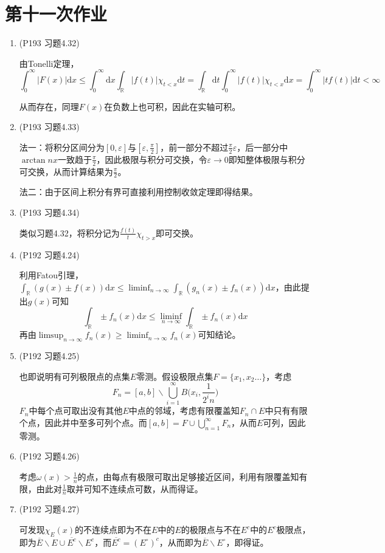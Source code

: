 \documentclass[a4paper,UTF8,fontset=windows]{ctexart}
\begin{document}
\section{第十一次作业}
\begin{enumerate}
    \item (P193 习题4.32)
    
    由Tonelli定理，
    \[\int_0^\infty|F(x)|\mathrm{d}x\le\int_0^\infty\mathrm{d}x\int_\mathbb{R}|f(t)|\chi_{t<x}\mathrm{d}t=\int_\mathbb{R}\mathrm{d}t\int_0^\infty|f(t)|\chi_{t<x}\mathrm{d}x=\int_0^\infty|tf(t)|\mathrm{d}t<\infty\]
    
    从而存在，同理$F(x)$在负数上也可积，因此在实轴可积。
    
    \item (P193 习题4.33)
    
    法一：将积分区间分为$[0,\varepsilon]$与$[\varepsilon,\frac{\pi}{2}]$，前一部分不超过$\frac{\pi}{2}\varepsilon$，后一部分中$\arctan{nx}$一致趋于$\frac{\pi}{2}$，因此极限与积分可交换，令$\varepsilon\to0$即知整体极限与积分可交换，从而计算结果为$\frac{\pi}{2}$。
    
    法二：由于区间上积分有界可直接利用控制收敛定理即得结果。
    
    \item (P193 习题4.34)
    
    类似习题4.32，将积分记为$\frac{f(t)}{t}\chi_{t>x}$即可交换。
    
    \item (P192 习题4.24)
    
    利用Fatou引理，$\int_\mathbb{R}(g(x)\pm f(x))\mathrm{d}x\le\liminf_{n\to\infty}\int_\mathbb{R}(g_n(x)\pm f_n(x))\mathrm{d}x$，由此提出$g(x)$可知
    $$\int_\mathbb{R}\pm f_n(x)\mathrm{d}x\le\liminf_{n\to\infty}\int_\mathbb{R}\pm f_n(x)\mathrm{d}x$$
    再由$\limsup_{n\to\infty}f_n(x)\ge\liminf_{n\to\infty}f_n(x)$可知结论。
    
    \item (P192 习题4.25)
    
    也即说明有可列极限点的点集$E$零测。假设极限点集$F=\{x_1,x_2\dots\}$，考虑
    $$F_n=[a,b]\backslash\bigcup_{i=1}^\infty B\bigg(x_i,\frac{1}{2^in}\bigg)$$
    $F_n$中每个点可取出没有其他$E$中点的邻域，考虑有限覆盖知$F_n\cap E$中只有有限个点，因此并中至多可列个点。而$[a,b]=F\cup \bigcup_{n=1}^\infty F_n$，从而$E$可列，因此零测。
    
    \item (P192 习题4.26)
    
    考虑$\omega(x)>\frac{1}{n}$的点，由每点有极限可取出足够接近区间，利用有限覆盖知有限，由此对$\frac{1}{n}$取并可知不连续点可数，从而得证。
    
    \item (P192 习题4.27)
    
    可发现$\chi_{E}(x)$的不连续点即为不在$E$中的$E$的极限点与不在$E^c$中的$E^c$极限点，即为$\overline{E}\backslash E\cup\overline{E^c}\backslash E^c$，而$\overline{E^c}=(E^\circ)^c$，从而即为$\overline{E}\backslash E^\circ$，即得证。
\end{enumerate}
\end{document}
